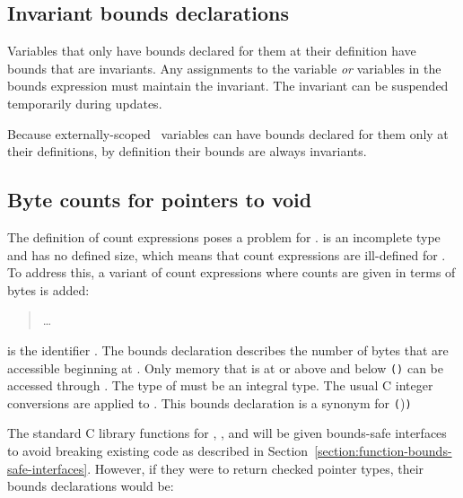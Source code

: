 \subsection{Invariant bounds declarations}
\label{section:invariant-bounds-declarations}

Variables that only have bounds declared for them at their definition
have bounds that are invariants. Any assignments to the variable
\emph{or} variables in the bounds expression must maintain the
invariant. The invariant can be suspended temporarily during updates.

Because externally-scoped \arrayptr\ variables can have bounds declared
for them only at their definitions, by definition their bounds are
always invariants.

\subsection{Byte counts for pointers to void}
\label{section:pointers-to-void}

The definition of count expressions poses a problem for
\arrayptrvoid.  is an
incomplete type and has no defined size, which means that count
expressions are ill-defined for
\arrayptrvoid. To address this, a
variant of count expressions where counts are given in terms of bytes is
added:


\begin{quote}
\ldots{}

\end{quote}

 is the identifier .
The bounds declaration 
describes the number of bytes that are accessible beginning at .
Only memory that is at or above  and below
\lstinline|(|\arrayptrchar\lstinline|)|  \code{+}  can be accessed through
. The type of  must be an integral type.  The usual C integer conversions are
applied to .  This bounds declaration is a synonym for
           {
                      {\lstinline|(|\arrayptrchar)\lstinline|)|  \code{+} }
                      {}}

The standard C library functions for , , and
 will be
given bounds-safe interfaces to avoid breaking existing code as
described in Section~\ref{section:function-bounds-safe-interfaces}.
However, if they were to return checked pointer
types, their bounds declarations would be:

